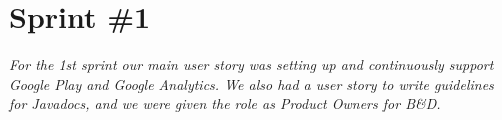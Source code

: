 \chapter{Sprint \#1} \label{ChapSprint1}
\textit{For the 1st sprint our main user story was setting up and continuously support Google Play and Google Analytics. We also had a user story to write guidelines for Javadocs, and we were given the role as Product Owners for B\&D.}




